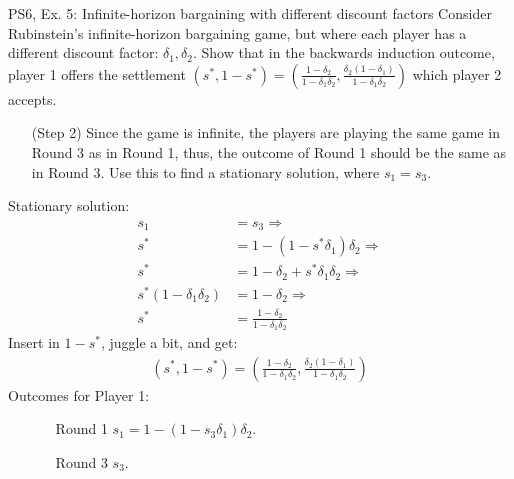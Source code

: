 \begin{frame}{PS6, Ex. 5: Infinite-horizon bargaining with different discount factors}
    Consider Rubinstein's infinite-horizon bargaining game, but where each player has a different discount factor: $\delta_1,\delta_2$. Show that in the backwards induction outcome, player 1 offers the settlement
    $(s^{*},1-s^{*})=\left( \frac{1-\delta_2}{1-\delta_1\delta_2},\frac{\delta_2(1-\delta_1)}{1-\delta_1\delta_2}\right)$
    which player 2 accepts.
    \begin{itemize}
      \item[(Step 2)] Since the game is infinite, the players are playing the same game in Round 3 as in Round 1, thus, the outcome of Round 1 should be the same as in Round 3. Use this to find a stationary solution, where $s_{1}=s_{3}$.
    \end{itemize}
    \vfill\null
  \begin{multicols}{2}
    Stationary solution:
    \begin{align*}
          s_1&= s_3 \Rightarrow\\
        s^{*}&= 1- (1-s^{*}\delta_1)\delta_2 \Rightarrow\\
        s^{*}&= 1-\delta_2+s^{*}\delta_1\delta_2 \Rightarrow\\
        s^{*}(1-\delta_1\delta_2)&= 1-\delta_2 \Rightarrow\\
        s^{*}&= \frac{1-\delta_2}{1-\delta_1\delta_2}
    \end{align*}
    Insert in $1-s^{*}$, juggle a bit, and get:
    \begin{align*}
        (s^{*},1-s^{*})= \left( \frac{1-\delta_2}{1-\delta_1\delta_2},\frac{\delta_2(1-\delta_1)}{1-\delta_1\delta_2}\right)
    \end{align*}
    \vfill\null \columnbreak
    Outcomes for Player 1:
    \begin{itemize}
        \item[]\vspace{-8pt}
            \begin{itemize}\normalsize
            \item[Round 1] $s_1 = 1-(1-s_3\delta_1)\delta_2$.
            \item[Round 3] $s_3$.
            \end{itemize}
    \end{itemize}
    \vfill\null
  \end{multicols}
    \vfill\null
\end{frame}


